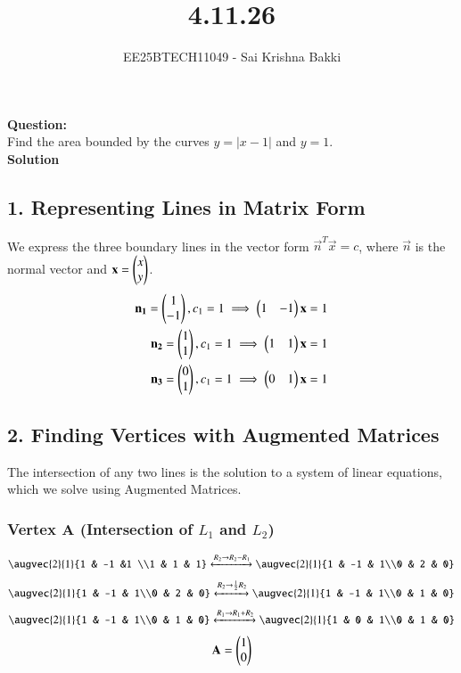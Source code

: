 \documentclass[journal]{IEEEtran}
\begin{document}

\vspace{3cm}

\title{4.11.26}
\author{EE25BTECH11049 - Sai Krishna Bakki}
\maketitle
\textbf{Question:}\\
Find the area bounded by the curves $y = |x - 1|$ and $y = 1$.\\
\textbf{Solution}
\subsection*{1. Representing Lines in Matrix Form}
We express the three boundary lines in the vector form $\vec{n}^T \vec{x} = c$, where $\vec{n}$ is the normal vector and $\mathbf{x} = \begin{pmatrix}x \\ y\end{pmatrix}$.
\begin{align}
    \mathbf{n_1}=\begin{pmatrix}1\\-1\end{pmatrix},c_1=1\implies \begin{pmatrix}1 & -1\end{pmatrix}\mathbf{x}=1\\
    \mathbf{n_2}=\begin{pmatrix}1\\1\end{pmatrix},c_1=1\implies \begin{pmatrix}1 & 1\end{pmatrix}\mathbf{x}=1\\
    \mathbf{n_3}=\begin{pmatrix}0\\1\end{pmatrix},c_1=1\implies \begin{pmatrix}0 &1\end{pmatrix}\mathbf{x}=1
\end{align}

\subsection*{2. Finding Vertices with Augmented Matrices}
The intersection of any two lines is the solution to a system of linear equations, which we solve using Augmented Matrices.

\subsubsection*{Vertex A (Intersection of $L_1$ and $L_2$)}
\begin{align}
   \augvec{2}{1}{1 & -1 &1 \\1 & 1 & 1}\xleftrightarrow[]{R_2\rightarrow R_2-R_1}\augvec{2}{1}{1 & -1 & 1\\0 & 2 & 0}
\end{align}
\begin{align}
   \augvec{2}{1}{1 & -1 & 1\\0 & 2 & 0}\xleftrightarrow[]{R_2\rightarrow \frac{1}{2}R_2}\augvec{2}{1}{1 & -1 & 1\\0 & 1 & 0}
\end{align}
\begin{align}
   \augvec{2}{1}{1 & -1 & 1\\0 & 1 & 0}\xleftrightarrow[]{R_1\rightarrow R_1+R_2}\augvec{2}{1}{1 & 0 & 1\\0 & 1 & 0}
\end{align}
\begin{align}
    \mathbf{A}=\begin{pmatrix}1\\0\end{pmatrix}
\end{align}
\end{document}
